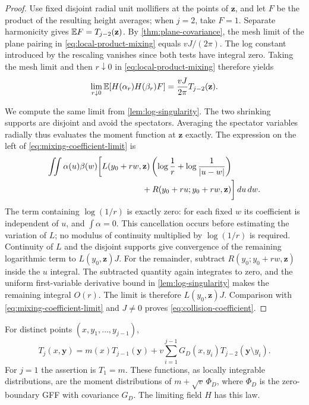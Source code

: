 \begin{proof}
Use fixed disjoint radial unit mollifiers at the points of
$\mathbf z$, and let $F$ be the product of the resulting height
averages; when $j=2$, take $F=1$. Separate harmonicity gives
$\mathbb E F=T_{j-2}(\mathbf z)$. By \cref{thm:plane-covariance}, the
mesh limit of the plane pairing in
\eqref{eq:local-product-mixing} equals $vJ/(2\pi)$. The log
constant introduced by the rescaling vanishes since both tests
have integral zero. Taking the mesh limit and then $r\downarrow0$
in \eqref{eq:local-product-mixing} therefore yields
\begin{equation}
 \lim_{r\downarrow0}\mathbb E[H(\alpha_r)H(\beta_r)F]
                  =\frac{vJ}{2\pi}T_{j-2}(\mathbf z).
 \label{eq:mixing-coefficient-limit}
\end{equation}

We compute the same limit from \cref{lem:log-singularity}. The two
shrinking supports are disjoint and avoid the spectators. Averaging
the spectator variables radially thus evaluates the moment function
at $\mathbf z$ exactly. The expression on the left of
\eqref{eq:mixing-coefficient-limit} is
\begin{align*}
 \iint\alpha(u)\beta(w)\bigg[
 &L(y_0+rw,\mathbf z)
       \left(\log\frac1r+\log\frac1{|u-w|}\right)\\
 &\hspace{17mm}+R(y_0+ru;y_0+rw,\mathbf z)\bigg]\,du\,dw.
\end{align*}
The term containing $\log(1/r)$ is exactly zero: for each fixed
$w$ its coefficient is independent of $u$, and $\int\alpha=0$.
This cancellation occurs before estimating the variation of $L$;
no modulus of continuity multiplied by $\log(1/r)$ is required.
Continuity of $L$ and the disjoint supports give convergence of
the remaining logarithmic term to $L(y_0,\mathbf z)J$.
For the remainder, subtract
$R(y_0;y_0+rw,\mathbf z)$ inside the $u$ integral. The subtracted
quantity again integrates to zero, and the uniform first-variable
derivative bound in \cref{lem:log-singularity} makes the remaining
integral $O(r)$. The limit is therefore $L(y_0,\mathbf z)J$.
Comparison with \eqref{eq:mixing-coefficient-limit} and $J\ne0$
proves \eqref{eq:collision-coefficient}.
\end{proof}

\begin{theorem}
\label{thm:gaussian-moments}
For distinct points $(x,y_1,\ldots,y_{j-1})$,
\begin{equation}
 T_j(x,\mathbf y)
   =m(x)T_{j-1}(\mathbf y)
      +v\sum_{i=1}^{j-1}G_D(x,y_i)
                    T_{j-2}(\mathbf y\setminus y_i).
 \label{eq:gaussian-recursion}
\end{equation}
For $j=1$ the assertion is $T_1=m$. These functions, as locally
integrable distributions, are the moment distributions of
$m+\sqrt v\,\Phi_D$, where $\Phi_D$ is the zero-boundary GFF with
covariance $G_D$. The limiting field $H$ has this law.
\end{theorem}


